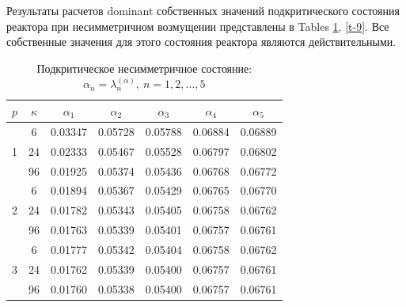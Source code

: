 \documentclass[authoryear]{elsarticle}
\begin{document}
Результаты расчетов dominant собственных значений подкритического состояния реактора
при несимметричном возмущении представлены в Tables \ref{t-8}, \ref{t-9}. Все
собственные значения для этого состояния реактора являются действительными. 

\begin{table}[h]
\caption{Подкритическое несимметричное состояние: $\alpha_n = \lambda_n^{(\alpha )}, \ n = 1,2, ..., 5$}
\label{t-8}
\begin{center}
\begin{tabular}{ccccccc}
\hline
$p$ & $\kappa$ & $\alpha_1$ &  $\alpha_2$ & $\alpha_3$ &  $\alpha_4$ & $\alpha_5$ \\ 
\hline
   & 6 & 0.03347 & 0.05728 & 0.05788 & 0.06884 & 0.06889 \\ 
1 & 24 & 0.02333 & 0.05467 & 0.05528 & 0.06797 & 0.06802 \\ 
  & 96 & 0.01925 & 0.05374 & 0.05436 & 0.06768 & 0.06772 \\ 
\hline
   & 6 & 0.01894 & 0.05367 & 0.05429 & 0.06765 & 0.06770 \\ 
2 & 24 & 0.01782 & 0.05343 & 0.05405 & 0.06758 & 0.06762 \\ 
  & 96 & 0.01763 & 0.05339 & 0.05401 & 0.06757 & 0.06761 \\ 
\hline
   & 6 & 0.01777 & 0.05342 & 0.05404 & 0.06758 & 0.06762 \\ 
3 & 24 & 0.01762 & 0.05339 & 0.05400 & 0.06757 & 0.06761 \\ 
  & 96 & 0.01760 & 0.05338 & 0.05400 & 0.06757 & 0.06761 \\ 
\hline
\end{tabular}
\end{center}
\end{table}
\end{document}
